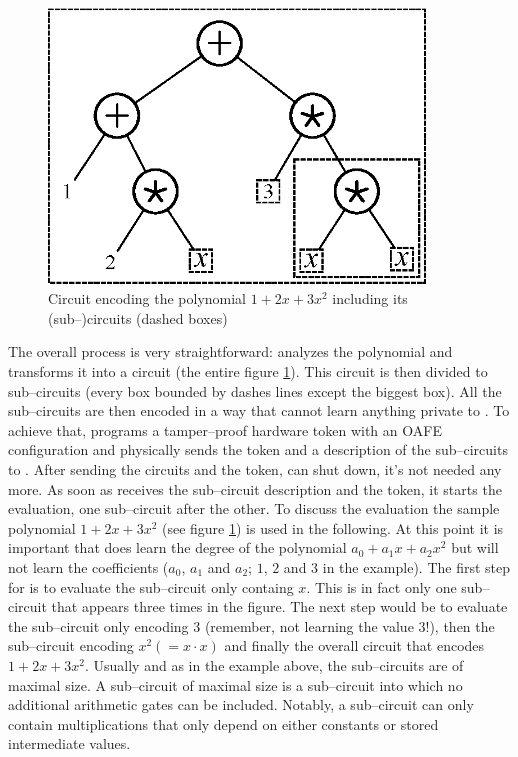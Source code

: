 \begin{figure}[htb]
  \centering
  \includegraphics[width=10cm]{images/sample-polynomial.eps}
  \caption{Circuit encoding the polynomial $1 + 2x + 3x^2$ including its
    (sub--)circuits (dashed boxes)}
  \label{fig:sample-poly}
\end{figure}

The overall process is very straightforward: \JWpOne{} analyzes the polynomial
and transforms it into a circuit (the entire figure \ref{fig:sample-poly}). This
circuit is then divided to sub--circuits (every box bounded by dashes lines
except the biggest box). All the sub--circuits are then encoded in a way that
\JWpTwo{} cannot learn anything private to \JWpOne{}. To achieve that, \JWpOne{}
programs a tamper--proof hardware token with an OAFE configuration and
physically sends the token and a description of the sub--circuits to \JWpTwo{}.
After sending the circuits and the token, \JWpOne{} can shut down, it's not
needed any more.  As soon as \JWpTwo{} receives the sub--circuit description and
the token, it starts the evaluation, one sub--circuit after the other. To
discuss the evaluation the sample polynomial $1 + 2x + 3x^2$ (see figure
\ref{fig:sample-poly}) is used in the following. At this point it is
important that \JWpTwo{} does learn the degree of the polynomial $a_0 + a_1x +
a_2x^2$ but will not learn the coefficients ($a_0$, $a_1$ and $a_2$; $1$, $2$
and $3$ in the example). The first step for \JWpTwo{} is to evaluate the
sub--circuit only containg $x$. This is in fact only one sub--circuit that
appears three times in the figure. The next step would be to evaluate the
sub--circuit only encoding $3$ (remember, not learning the value $3$!), then the
sub--circuit encoding $x^2 (= x \cdot x)$ and finally the overall circuit that
encodes $1 + 2x + 3x^2$.  Usually and as in the example above, the sub--circuits
are of maximal size. A sub--circuit of maximal size is a sub--circuit into which
no additional arithmetic gates can be included. Notably, a sub--circuit can only
contain multiplications that only depend on either constants or stored
intermediate values.

